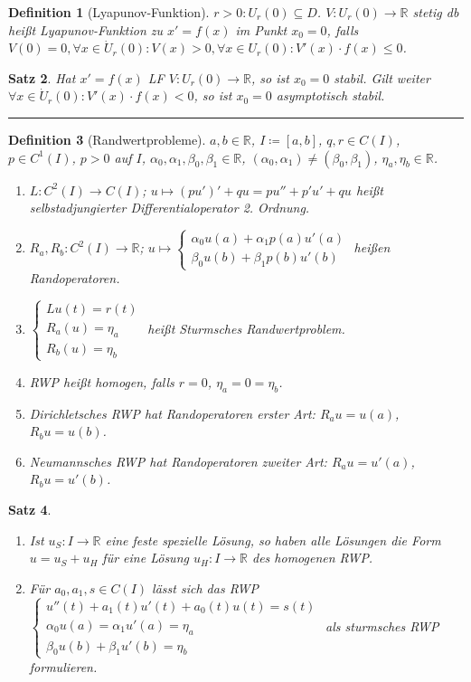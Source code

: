 \documentclass[a4paper]{article}
\newcounter{Sec}
\theoremstyle{marginbreak}
\newtheorem{definition}{Definition}[Sec]
\newtheorem{satz}[definition]{Satz}
\newcommand{\sep}{%
	\rule{\textwidth}{0.3pt}%
	\stepcounter{Sec}%
	}
\newcommand{\R}{\mathbb{R}}
\begin{document}
	\begin{definition}[Lyapunov-Funktion]
		$r>0: U_r(0)\subseteq D$. $V\colon U_r(0)\to\R$ stetig db heißt Lyapunov-Funktion
		zu $x'=f(x)$ im Punkt $x_0=0$, falls $V(0)=0, \forall x\in \dot{U}_r(0): V(x)>0,
		\forall x\in U_r(0): V'(x)\cdot f(x)\leq 0$.
	\end{definition}
	\begin{satz}
		Hat $x'=f(x)$ LF $V\colon U_r(0)\to\R$, so ist $x_0=0$ stabil. Gilt weiter
		$\forall x\in\dot{U}_r(0): V'(x)\cdot f(x)<0$, so ist $x_0=0$ asymptotisch stabil.
	\end{satz}
	\sep
	\begin{definition}[Randwertprobleme]
		$a, b\in\R$, $I\coloneqq [a, b]$, $q, r\in C(I)$, $p\in C^1(I)$, $p>0$ auf $I$,
		$\alpha_0,\alpha_1,\beta_0,\beta_1\in\R$, $(\alpha_0,\alpha_1)\neq(\beta_0,\beta_1)$, $\eta_a,\eta_b\in\R$.
		\begin{enumerate}[label=(\alph*)]
			\item $L\colon C^2(I)\to C(I)$; $u\mapsto (pu')'+qu = pu''+p'u'+qu$ heißt selbstadjungierter
				Differentialoperator 2. Ordnung.
			\item $R_a, R_b\colon C^2(I)\to\R$; $u\mapsto\begin{cases}\alpha_0 u(a)+\alpha_1p(a)u'(a)\\
				\beta_0u(b)+\beta_1p(b)u'(b)\end{cases}$ heißen Randoperatoren.
			\item $\begin{cases}Lu(t)=r(t)\\R_a(u)=\eta_a\\R_b(u)=\eta_b\end{cases}$ heißt
				Sturmsches Randwertproblem.
			\item RWP heißt homogen, falls $r=0$, $\eta_a=0=\eta_b$.
			\item Dirichletsches RWP hat Randoperatoren erster Art: $R_au=u(a)$, $R_bu=u(b)$.
			\item Neumannsches RWP hat Randoperatoren zweiter Art: $R_au=u'(a)$, $R_bu=u'(b)$.
		\end{enumerate}
	\end{definition}
	\begin{satz}
		\begin{enumerate}[label=(\alph*)]
			\item Ist $u_S\colon I\to\R$ eine feste spezielle Lösung, so haben alle Lösungen
				die Form $u=u_S+u_H$ für eine Lösung $u_H\colon I\to\R$ des homogenen RWP.
			\item Für $a_0, a_1, s\in C(I)$ lässt sich das RWP $\begin{cases}u''(t)+a_1(t)u'(t)+a_0(t)u(t)=s(t)\\
				\alpha_0u(a)=\alpha_1u'(a)=\eta_a\\\beta_0u(b)+\beta_1u'(b)=\eta_b\end{cases}$ als sturmsches
				RWP formulieren.
		\end{enumerate}
	\end{satz}
\end{document}
